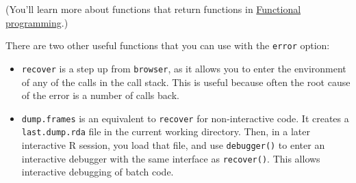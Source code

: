 \begin{Shaded}
\begin{Highlighting}[]
\StringTok{ }\NormalTok{() \{}
\StringTok{ }\NormalTok{(}\NormalTok{)}
  \NormalTok{() \{}
    \NormalTok{(}
    \NormalTok{()}
\NormalTok{  \}}
\NormalTok{\}}
\NormalTok{(} \NormalTok{())}

\StringTok{ }\NormalTok{() }\NormalTok{(}\NormalTok{)}
\NormalTok{()}
\NormalTok{()}
\end{Highlighting}
\end{Shaded}

(You'll learn more about functions that return functions in
\protect\hyperlink{functional-programming}{Functional programming}.)

There are two other useful functions that you can use with the
\texttt{error} option:

\begin{itemize}
\item
  \texttt{recover} is a step up from \texttt{browser}, as it allows you
  to enter the environment of any of the calls in the call stack. This
  is useful because often the root cause of the error is a number of
  calls back. 
\item
  \texttt{dump.frames} is an equivalent to \texttt{recover} for
  non-interactive code. It creates a \texttt{last.dump.rda} file in the
  current working directory. Then, in a later interactive R session, you
  load that file, and use \texttt{debugger()} to enter an interactive
  debugger with the same interface as \texttt{recover()}. This allows
  interactive debugging of batch code. 

\begin{Shaded}
\begin{Highlighting}[]
\StringTok{ }\NormalTok{() \{}
  \NormalTok{(} \NormalTok{)}
  \NormalTok{(} \NormalTok{)}
\NormalTok{\}}
\NormalTok{(}

\NormalTok{(}\NormalTok{)}
\NormalTok{()}
\end{Highlighting}
\end{Shaded}
\end{itemize}

